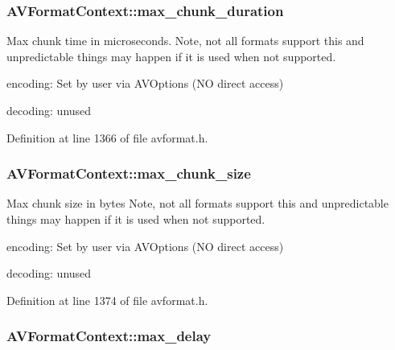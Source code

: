 \subsubsection[{\texorpdfstring{max\+\_\+chunk\+\_\+duration}{max_chunk_duration}}]{ A\+V\+Format\+Context\+::max\+\_\+chunk\+\_\+duration}\hypertarget{struct_a_v_format_context_ae20c589e20f22f74f1687702de6d2e8e}{}\label{struct_a_v_format_context_ae20c589e20f22f74f1687702de6d2e8e}
Max chunk time in microseconds. Note, not all formats support this and unpredictable things may happen if it is used when not supported.
\begin{DoxyItemize}
\item encoding\+: Set by user via A\+V\+Options (NO direct access)
\item decoding\+: unused 
\end{DoxyItemize}

Definition at line 1366 of file avformat.\+h.

\subsubsection[{\texorpdfstring{max\+\_\+chunk\+\_\+size}{max_chunk_size}}]{ A\+V\+Format\+Context\+::max\+\_\+chunk\+\_\+size}\hypertarget{struct_a_v_format_context_a3d8cfff712c81d1cbc725b40ce02f7e7}{}\label{struct_a_v_format_context_a3d8cfff712c81d1cbc725b40ce02f7e7}
Max chunk size in bytes Note, not all formats support this and unpredictable things may happen if it is used when not supported.
\begin{DoxyItemize}
\item encoding\+: Set by user via A\+V\+Options (NO direct access)
\item decoding\+: unused 
\end{DoxyItemize}

Definition at line 1374 of file avformat.\+h.

\subsubsection[{\texorpdfstring{max\+\_\+delay}{max_delay}}]{ A\+V\+Format\+Context\+::max\+\_\+delay}\hypertarget{struct_a_v_format_context_a58422ed3d461b3440a15cf057ac5f5b7}{}\label{struct_a_v_format_context_a58422ed3d461b3440a15cf057ac5f5b7}


